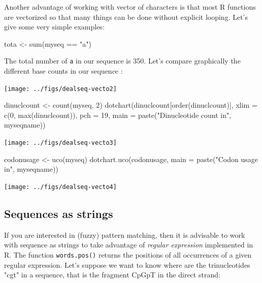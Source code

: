 \documentclass{article}
\begin{document}
Another advantage of working with vector of characters is that most R functions
are vectorized so that many things can be done without explicit looping. Let's
give some very simple examples:

\begin{Schunk}
\begin{Sinput}
 tota <- sum(myseq == "a")
\end{Sinput}
\end{Schunk}

The total number of \texttt{a} in our sequence is 350. Let's compare
graphically the different base counts in our sequence :

\begin{Schunk}
\end{Schunk}
\texttt{[image: ../figs/dealseq-vecto2]}

\begin{Schunk}
\begin{Sinput}
 dinuclcount <- count(myseq, 2)
 dotchart(dinuclcount[order(dinuclcount)], xlim = c(0, max(dinuclcount)), 
     pch = 19, main = paste("Dinucleotide count in", myseqname))
\end{Sinput}
\end{Schunk}
\texttt{[image: ../figs/dealseq-vecto3]}

\begin{Schunk}
\begin{Sinput}
 codonusage <- uco(myseq)
 dotchart.uco(codonusage, main = paste("Codon usage in", myseqname))
\end{Sinput}
\end{Schunk}
\texttt{[image: ../figs/dealseq-vecto4]}


\subsection{Sequences as strings}

If you are interested in (fuzzy) pattern matching, then it is advisable to work with
sequence as strings to take advantage of \emph{regular expression} implemented
in R. The function \texttt{words.pos()} returns the positions of all occurrences
of a given regular expression. Let's suppose we want to know where are the trinucleotides
"cgt" in a sequence, that is the fragment CpGpT in the direct strand:
\end{document}

